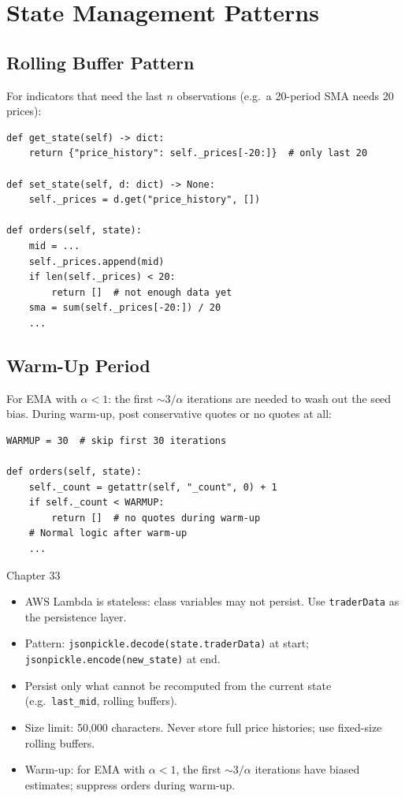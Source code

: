 \documentclass[12pt,a4paper,openany]{report}
\theoremstyle{definition}
\begin{document}
\section{State Management Patterns}

\subsection{Rolling Buffer Pattern}

For indicators that need the last $n$ observations (e.g.\ a 20-period SMA needs 20 prices):

\begin{lstlisting}[caption={Rolling buffer pattern}]
def get_state(self) -> dict:
    return {"price_history": self._prices[-20:]}  # only last 20

def set_state(self, d: dict) -> None:
    self._prices = d.get("price_history", [])

def orders(self, state):
    mid = ...
    self._prices.append(mid)
    if len(self._prices) < 20:
        return []  # not enough data yet
    sma = sum(self._prices[-20:]) / 20
    ...
\end{lstlisting}

\subsection{Warm-Up Period}

For EMA with $\alpha < 1$: the first $\sim 3/\alpha$ iterations are needed to wash out the seed bias. During warm-up, post conservative quotes or no quotes at all:

\begin{lstlisting}[caption={Warm-up handling}]
WARMUP = 30  # skip first 30 iterations

def orders(self, state):
    self._count = getattr(self, "_count", 0) + 1
    if self._count < WARMUP:
        return []  # no quotes during warm-up
    # Normal logic after warm-up
    ...
\end{lstlisting}

\begin{takeawaybox}{Chapter 33}
\begin{itemize}
  \item AWS Lambda is stateless: class variables may not persist. Use \texttt{traderData} as the persistence layer.
  \item Pattern: \texttt{jsonpickle.decode(state.traderData)} at start; \texttt{jsonpickle.encode(new\_state)} at end.
  \item Persist only what cannot be recomputed from the current state (e.g.\ \texttt{last\_mid}, rolling buffers).
  \item Size limit: 50{,}000 characters. Never store full price histories; use fixed-size rolling buffers.
  \item Warm-up: for EMA with $\alpha < 1$, the first $\sim 3/\alpha$ iterations have biased estimates; suppress orders during warm-up.
\end{itemize}
\end{takeawaybox}
\end{document}

